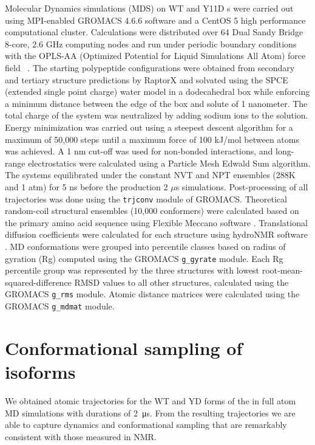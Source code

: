 Molecular Dynamics simulations (MDS) on WT and Y11D \gct{}s were carried out using MPI-enabled GROMACS 4.6.6 software\cite{hess2008gromacs} and a CentOS 5 high performance computational cluster. Calculations were distributed over 64 Dual Sandy Bridge 8-core, 2.6 GHz computing nodes and run under periodic boundary conditions with the OPLS-AA (Optimized Potential for Liquid Simulations All Atom) force field ~\cite{kaminski2001evaluation}.  The starting \gct{} polypeptide configurations were obtained from secondary and tertiary structure predictions by RaptorX \cite{kallberg2012template} and solvated using the SPCE (extended single point charge) water model in a dodecahedral box while enforcing a minimum distance between the edge of the box and solute of 1 nanometer. The total charge of the system was neutralized by adding sodium ions to the solution. Energy minimization was carried out using a steepest descent algorithm for a maximum of 50,000 steps until a maximum force of 100 kJ/mol between atoms was achieved. A 1 nm cut-off was used for non-bonded interactions, and long-range electrostatics were calculated using a Particle Mesh Edwald Sum algorithm. The systems equilibrated under the constant NVT and NPT ensembles (288K and 1 atm) for 5 ns before the production 2 $\mu$s simulations. Post-processing of all trajectories was done using the \texttt{trjconv} module of GROMACS. Theoretical random-coil structural ensembles (10,000 conformers) were calculated based on the \gct{} primary amino acid sequence using Flexible Meccano software \cite{ozenne2012flexible}. Translational diffusion coefficients were calculated for each structure using hydroNMR software \cite{de2000hydronmr}. 
MD conformations were grouped into percentile classes based on radius of gyration (Rg) computed using the GROMACS \texttt{g\_gyrate} module. Each Rg percentile group was represented by the three structures with lowest root-mean-squared-difference RMSD values to all other structures, calculated using the GROMACS \texttt{g\_rms} module. Atomic distance matrices were calculated using the GROMACS \texttt{g\_mdmat} module.


\section{Conformational sampling of \gct{} isoforms}

We obtained atomic trajectories for the WT and YD forms of the \gct{} in full atom MD simulations with durations of \SI{2}{\us}. From the resulting trajectories we are able to capture dynamics and conformational sampling that are remarkably consistent with those measured in NMR.\\


